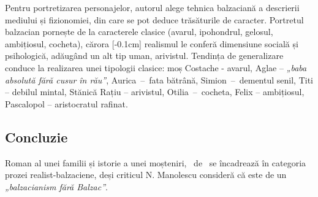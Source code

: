 Pentru portretizarea personajelor, autorul alege tehnica balzaciană a descrierii mediului și fizionomiei, din care se pot deduce trăsăturile de caracter. Portretul balzacian pornește de la caracterele clasice (avarul, ipohondrul, gelosul, ambițiosul, cocheta), \hbox{cărora} [-0.1cm]
realismul le conferă dimensiune socială și psihologică, adăugând un alt tip uman, arivistul. Tendința de generalizare conduce la realizarea unei tipologii clasice: moș Costache - avarul, Aglae -- \textit{„baba absolută fără cusur în rău”}, \hbox{Aurica -- fa}ta bătrână, \hbox{Simion -- de}mentul senil, Titi -- debilul mintal, Stănică Rațiu -- arivistul, \hbox{Otilia -- co}cheta, Felix -- ambițiosul, Pascalopol -- aristocratul rafinat.


\subsection{Concluzie}

Roman al unei familii și istorie a unei moșteniri, \operatitle\ de \operaauthor\ se încadrează în categoria prozei realist-balzaciene, deși criticul N. Manolescu consideră că este de un \textit{„balzacianism fără Balzac”}.
